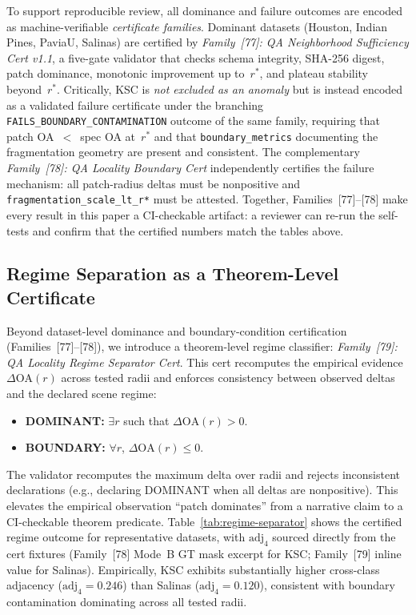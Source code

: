 \documentclass[journal]{IEEEtran}
\newcommand{\rstar}{r^{*}}
\newcommand{\AdjSalinas}{0.120} %
\newcommand{\AdjKSC}{0.246}     %
\begin{document}
To support reproducible review, all dominance and failure outcomes
are encoded as machine-verifiable \emph{certificate families}.
Dominant datasets (Houston, Indian Pines, PaviaU, Salinas) are
certified by \emph{Family~[77]: QA Neighborhood Sufficiency Cert
v1.1}, a five-gate validator that checks schema integrity, SHA-256
digest, patch dominance, monotonic improvement up to~$\rstar$, and
plateau stability beyond~$\rstar$.  Critically, KSC is \emph{not
excluded as an anomaly} but is instead encoded as a validated failure
certificate under the branching
\texttt{FAILS\_BOUNDARY\_CONTAMINATION} outcome of the same family,
requiring that patch OA~$<$~spec OA at~$\rstar$ and that
\texttt{boundary\_metrics} documenting the fragmentation geometry are
present and consistent.  The complementary \emph{Family~[78]: QA
Locality Boundary Cert} independently certifies the failure mechanism:
all patch-radius deltas must be nonpositive and
\texttt{fragmentation\_scale\_lt\_r*} must be attested.  Together,
Families~[77]--[78] make every result in this paper a CI-checkable
artifact: a reviewer can re-run the self-tests and confirm that the
certified numbers match the tables above.

\subsection{Regime Separation as a Theorem-Level Certificate}

Beyond dataset-level dominance and boundary-condition certification
(Families~[77]--[78]), we introduce a theorem-level regime classifier:
\emph{Family~[79]: QA Locality Regime Separator Cert}.  This cert
recomputes the empirical evidence $\Delta\mathrm{OA}(r)$ across tested
radii and enforces consistency between observed deltas and the declared
scene regime:

\begin{itemize}
\item \textbf{DOMINANT:} $\exists r$ such that $\Delta\mathrm{OA}(r) > 0$.
\item \textbf{BOUNDARY:} $\forall r$, $\Delta\mathrm{OA}(r) \le 0$.
\end{itemize}

The validator recomputes the maximum delta over radii and rejects
inconsistent declarations (e.g., declaring DOMINANT when all deltas
are nonpositive).  This elevates the empirical observation
``patch dominates'' from a narrative claim to a CI-checkable theorem
predicate.  Table~\ref{tab:regime-separator} shows the certified
regime outcome for representative datasets, with $\mathrm{adj}_4$
sourced directly from the cert fixtures (Family~[78] Mode~B
GT mask excerpt for KSC; Family~[79] inline value for Salinas).
Empirically, KSC exhibits substantially higher cross-class adjacency
($\mathrm{adj}_4{=}\AdjKSC$) than Salinas ($\mathrm{adj}_4{=}\AdjSalinas$),
consistent with boundary contamination dominating across all tested radii.
\end{document}
